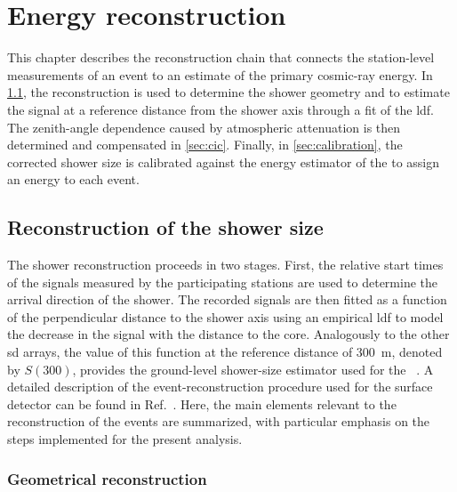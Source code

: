 \documentclass[main.tex]{subfiles}
\begin{document}
\chapter{Energy reconstruction}
\label{chap:energy_reconstruction}
\label{chapter:reconstruction}

This chapter describes the reconstruction chain that connects the station-level measurements of an event to an estimate of the primary cosmic-ray energy.
In \cref{sec:reconstruction_shower_size}, the \Offline reconstruction is used to determine the shower geometry and to estimate the signal at a reference distance from the shower axis through a fit of the \gls{ldf}.
The zenith-angle dependence caused by atmospheric attenuation is then determined and compensated in \cref{sec:cic}.
Finally, in \cref{sec:calibration}, the corrected shower size is calibrated against the energy estimator of the  to assign an energy to each  event.

\section{Reconstruction of the shower size}
\label{sec:reconstruction_shower_size}

The shower reconstruction proceeds in two stages.
First, the relative start times of the signals measured by the participating stations are used to determine the arrival direction of the shower.
The recorded signals are then fitted as a function of the perpendicular distance to the shower axis using an empirical \gls{ldf} to model the decrease in the signal with the distance to the core.
Analogously to the other \gls{sd} arrays, the value of this function at the reference distance of \SI{300}{\m}, denoted by $S(300)$, provides the ground-level shower-size estimator used for the ~\cite{Silli:2021:PerformanceSD433}.
A detailed description of the event-reconstruction procedure used for the surface detector can be found in Ref.~\cite{PierreAuger:2020:SDReconstruction}.
Here, the main elements relevant to the reconstruction of the  events are summarized, with particular emphasis on the steps implemented for the present analysis.

\subsection{Geometrical reconstruction}
\label{subsec:geometry_ldf}
\end{document}
